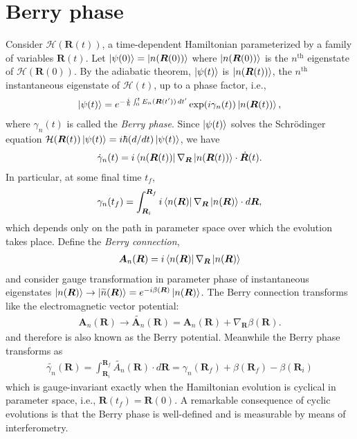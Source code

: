 \documentclass[reprint,
nofootinbib,
amsmath,amssymb,
aps]{revtex4-1}
\newcommand{\f}[2]{\frac{#1}{#2}}
\begin{document}
\section{Berry phase}\label{sect:1}
Consider $\mathcal{H}(\bm{R}(t))$, a time-dependent Hamiltonian parameterized by a family of variables $\bm{R}(t)$. Let $\ket{\psi(0)} = \ket{n(\bm{R}(0))}$ where $\ket{n(\bm{R}(0))}$ is the $n^\text{th}$ eigenstate of $\mathcal{H}(\bm{R}(0))$. By the adiabatic theorem, $\ket{\psi(t)}$ is $\ket{n(\bm{R}(t))}$, the $n^\text{th}$ instantaneous eigenstate of $\mathcal{H}(t)$, up to a phase factor, i.e.,
\begin{align*}
\ket{\psi(t)} = e^{ -\f{i}{\hbar }\int_0^t E_n(\bm{R} (t'))\,dt' } \exp(i\gamma_n(t)) \ket{n(\bm{R}(t))},
\end{align*}
where $\gamma_n(t)$ is called the \textit{Berry phase}. Since $\ket{\psi(t)}$ solves the Schr\"{o}dinger equation $\mathcal{H}(\bm{R}(t)) \ket{\psi(t)} = i\hbar (d/dt) \ket{{\psi}(t)}$, we have 
\begin{align*}
\dot{\gamma}_n(t) = i \bra{n(\bm{R}(t))} \nabla_{\bm{R}}  \ket{n(\bm{R}(t)) } \cdot \dot{\bm{R}}(t).
\end{align*}
In particular, at some final time $t_f$,
\begin{align}\label{eq:def}
\gamma_n(t_f) =   \int^{\bm{R}_f}_{\bm{R}_i} i \bra{n(\bm{R})} \nabla_{\bm{R}}  \ket{n(\bm{R}) } \cdot d{\bm{R}},
\end{align} 
which depends only on the path in parameter space over which the evolution takes place. Define the \textit{Berry connection}, 
\begin{align*}
\bm{A}_n(\bm{R}) = i \bra{n(\bm{R})} \nabla_{\bm{R}}  \ket{n(\bm{R}) }
\end{align*} 
and consider gauge transformation in parameter phase of instantaneous eigenstates $\ket{n(\bm{R})} \to \ket{\widetilde{n}(\bm{R})} = e^{-i\beta(\bm{R})}\ket{n(\bm{R})}$. The Berry connection transforms like the electromagnetic  vector potential:
\begin{align*}
\bm{A}_n(\bm{R}) \to  \widetilde{\bm{A}_n}(\bm{R}) = \bm{A}_n(\bm{R}) + \nabla_{\bm{R}} \beta (\bm{R}). 
\end{align*}
and therefore is also known as the Berry potential. Meanwhile the Berry phase transforms as
\begin{align*}
\widetilde{\gamma_n} (\bm{R}) = \int_{\bm{R}_i}^{\bm{R}_f} \widetilde{A_n}(\bm{R})\cdot d\bm{R} = \gamma_n(\bm{R}_f)  + \beta(\bm{R}_f) - \beta({\bm{R}_i})
\end{align*}
which is gauge-invariant exactly when the Hamiltonian evolution is cyclical in parameter space, i.e., $\bm{R}(t_f) = \bm{R}(0)$. A remarkable consequence of cyclic evolutions is that the Berry phase is well-defined and is measurable by means of interferometry. 
\end{document}
